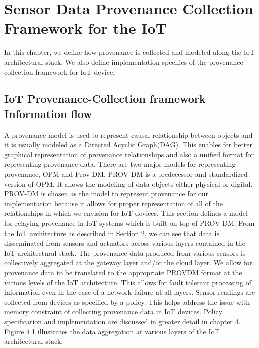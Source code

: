 
\chapter{Sensor Data Provenance Collection Framework for the IoT}

In this chapter, we define how provenance is collected and modeled along the IoT architectural stack. We also define implementation specifics of the provenance collection framework for IoT device. 

\section{IoT Provenance-Collection framework Information flow}
%

A provenance model is used to represent causal relationship between objects and it is usually modeled as a Directed Acyclic Graph(DAG). This enables for better graphical representation of provenance relationships and also a unified format for representing provenance data. There are two major models for representing provenance, OPM and Prov-DM. PROV-DM is a predecessor and standardized version of OPM. It allows the modeling of data objects either physical or digital. PROV-DM is chosen as the model to represent provenance for our implementation because it allows for proper representation of all of the relationships in which we envision for IoT devices. This section defines a model for relaying provenance in IoT systems which is built on top of PROV-DM. 
From the IoT architecture as described in Section 2, we can see that data is disseminated from sensors and actuators across various layers contained in the IoT architectural stack. The provenance data produced from various sensors is collectively aggregated at the gateway layer and/or the cloud layer. We allow for provenance data to be translated to the appropriate PROV\-DM format at the various levels of the IoT architecture. This allows for fault tolerant processing of information even in the case of a network failure at all layers. Sensor readings are collected from devices as specified by a policy. This helps address the issue with memory constraint  of collecting provenance data in IoT devices. Policy specification and implementation  are discussed in greater detail in chapter 4.  Figure 4.1 illustrates the data aggregation at various layers of the IoT architectural stack.


